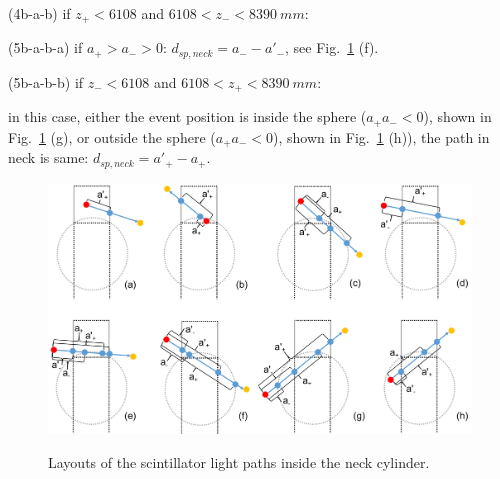 \begin{algorithm}
	\hspace{10mm}(4b-a-b) if $z_+<6108$ and $6108<z_-<8390~mm$:
	
	\hspace{12mm}(5b-a-b-a) if $a_+>a_->0$: $d_{sp,neck}=a_--a'_-$, see Fig.~\ref{lightpath_scintNeck} (f).
	
	\hspace{12mm}(5b-a-b-b) if $z_-<6108$ and $6108<z_+<8390~mm$:
	
	\hspace{14mm}in this case, either the event position is inside the sphere ($a_+a_-<0$), shown in Fig.~\ref{lightpath_scintNeck} (g), or outside the sphere ($a_+a_-<0$), shown in Fig.~\ref{lightpath_scintNeck} (h)), the path in neck is same: $d_{sp,neck}=a'_+ - a_+$.
\end{algorithm}


\begin{figure}
	\centering
	{\includegraphics[width=130mm]{scintpathNeck.png}}
	\caption{Layouts of the scintillator light paths inside the neck cylinder.\label{lightpath_scintNeck}}
\end{figure}

